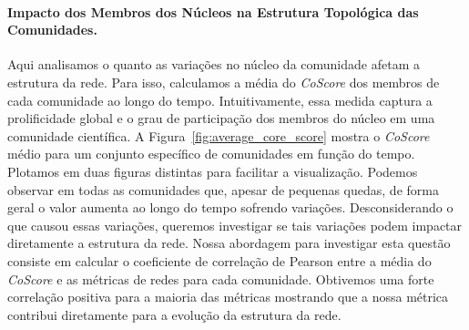 \documentclass[12pt]{article}
\begin{document}
\paragraph{Impacto dos Membros dos Núcleos na Estrutura Topológica das
Comunidades.}
Aqui analisamos o quanto as variações no núcleo da comunidade afetam a estrutura da rede. Para isso, calculamos 
a média do \textit{CoScore} dos membros de cada comunidade ao longo do tempo. Intuitivamente, essa medida captura a 
prolificidade global e o grau de participação dos membros do núcleo em uma comunidade científica. A Figura~\ref{fig:average_core_score} 
mostra o \textit{CoScore} médio para um conjunto específico de comunidades em função do tempo.
Plotamos em duas figuras distintas para facilitar a visualização. Podemos observar em todas as comunidades que, 
apesar de pequenas quedas, de forma geral o valor aumenta 
ao longo do tempo sofrendo variações. Desconsiderando o que 
causou essas variações, queremos investigar se tais variações podem impactar
diretamente a estrutura da rede. Nossa abordagem para investigar esta questão consiste em calcular 
o coeficiente de correlação de Pearson entre a média do
\textit{CoScore} e as métricas de redes para cada comunidade. Obtivemos uma forte correlação positiva para a maioria das métricas
mostrando que a nossa métrica contribui diretamente para a evolução da estrutura da rede.
\end{document}
